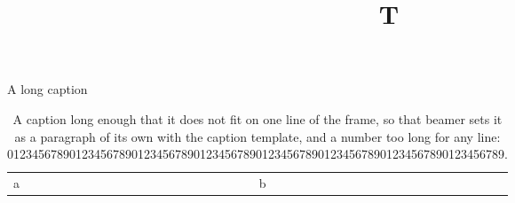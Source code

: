 \documentclass[aspectratio=43,12pt]{beamer}
\title{T}
\begin{document}
\begin{frame}{A long caption}
\begin{table}
\begin{tabular}{ll}
a & b \\
\end{tabular}
\caption{A caption long enough that it does not fit on one line of the frame, so that beamer sets it as a paragraph of its own with the caption template, and a number too long for any line: 01234567890123456789012345678901234567890123456789012345678901234567890123456789.}
\end{table}
\end{frame}
\end{document}
